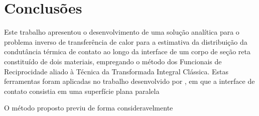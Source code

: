 \section{Conclusões}

Este trabalho apresentou o desenvolvimento de uma solução analítica para o problema inverso de transferência de calor para a estimativa da distribuição da condutância térmica de contato ao longo da interface de um corpo de seção reta constituído de dois materiais, empregando o método dos Funcionais de Reciprocidade aliado à Técnica da Transformada Integral Clássica. Estas ferramentas foram aplicadas no trabalho desenvolvido por \cite{tese_padilha}, em que a interface de contato consistia em uma superfície plana paralela 

O método proposto previu de forma consideravelmente
